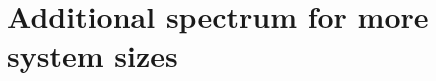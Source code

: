 \documentclass[longbibliography, aps, prx, amsmath, amssymb, amsfonts, twocolumn,superscriptaddress, footinbib]{revtex4-1}
\begin{document}


	\section{Additional spectrum for more system sizes~\label{sec:AddtionalSpectrum}}
	
\end{document}
